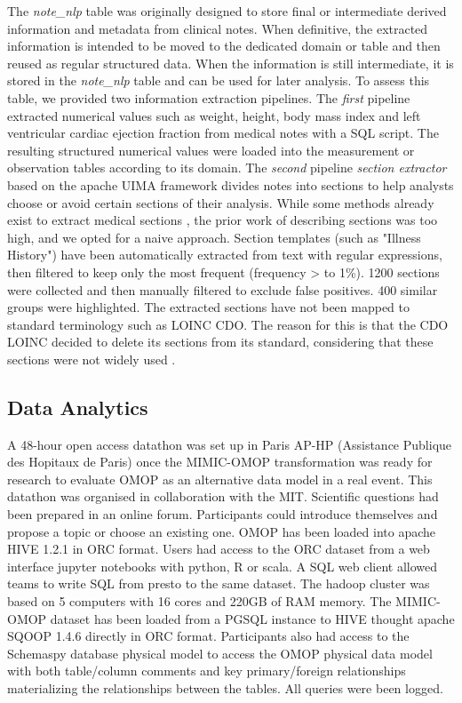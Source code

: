 The \textit{note\_nlp} table was originally designed to store final or intermediate 
derived information and metadata from clinical notes. When definitive, the 
extracted information is intended to be moved to the dedicated domain or table 
and then reused as regular structured data. 
When the information is still intermediate, it is stored in the \textit{note\_nlp} 
table and can be used for later analysis. 
To assess this table, we provided two information extraction pipelines. 
The \emph{first} pipeline extracted numerical values such as weight, height, 
body mass index and left ventricular cardiac ejection fraction from medical notes 
with a SQL script. The resulting structured numerical values were loaded into the 
measurement or observation tables according to its domain. 
The \emph{second} pipeline \emph{section extractor} based on the apache UIMA 
framework divides notes into sections to help analysts choose or avoid certain 
sections of their analysis. While some methods already exist to extract 
medical sections \cite{section-extraction}, the prior work of describing sections 
was too high, and we opted for a naive approach. Section templates (such as 
"Illness History") have been automatically extracted from text with regular 
expressions, then filtered to keep only the most frequent (frequency > to 1\%). 
1200 sections were collected and then manually filtered to exclude false positives. 
400 similar groups were highlighted. The extracted sections have not been mapped 
to standard terminology such as LOINC CDO. The reason for this is that the CDO 
LOINC decided to delete its sections from its standard, considering that these 
sections were not widely used  \cite{loinc-website}.


%
%
\subsection{Data Analytics}

A 48-hour open access datathon \cite{mimic-omop-datathon} was set up in Paris AP-HP 
(Assistance Publique des Hopitaux de Paris) once the MIMIC-OMOP transformation was 
ready for research to evaluate OMOP as an alternative data model in a real event. 
This datathon was organised in collaboration with the MIT.
Scientific questions had been prepared in an online forum. Participants could 
introduce themselves and propose a topic or choose an existing one. 
OMOP has been loaded into apache HIVE 1.2.1 in ORC format. Users had access to 
the ORC dataset from a web interface jupyter notebooks with python, R or scala. 
A SQL web client allowed teams to write SQL from presto to the same dataset. 
The hadoop cluster was based on 5 computers with 16 cores and 220GB of RAM memory. 
The MIMIC-OMOP dataset has been loaded from a PGSQL instance to HIVE thought apache 
SQOOP 1.4.6 directly in ORC format. Participants also had access to the Schemaspy 
database physical model to access the OMOP physical data model with both 
table/column comments and key primary/foreign relationships materializing the 
relationships between the tables. All queries were been logged.

